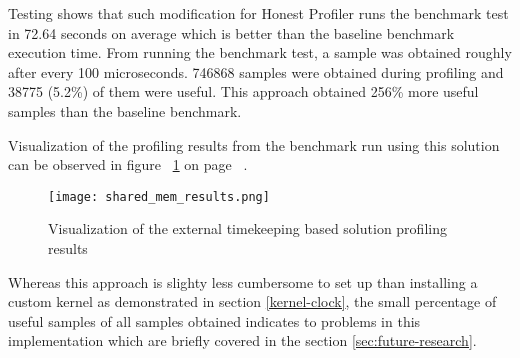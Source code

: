 \documentclass[..thesis.tex]{subfiles}
\begin{document}
Testing shows that such modification for Honest Profiler runs the benchmark test in 72.64 seconds on average which is better than the baseline benchmark execution time.  From running the benchmark test, a sample was obtained roughly after every 100 microseconds. 746868 samples were obtained during profiling and 38775 (5.2\%) of them were useful. This approach obtained 256\% more useful samples than the baseline benchmark.

Visualization of the profiling results from the benchmark run using this solution can be observed in figure ~\ref{fig:shared-mem-results} on page ~\pageref{fig:shared-mem-results}.
\begin{figure}[H]
\texttt{[image: shared\_mem\_results.png]}
\caption{Visualization of the external timekeeping based solution profiling results}
\label{fig:shared-mem-results}
\end{figure} 

Whereas this approach is slighty less cumbersome to set up than installing a custom kernel as demonstrated in section \ref{kernel-clock}, the small percentage of useful samples of all samples obtained indicates to problems in this implementation which are briefly covered in the section \ref{sec:future-research}.
\end{document}
